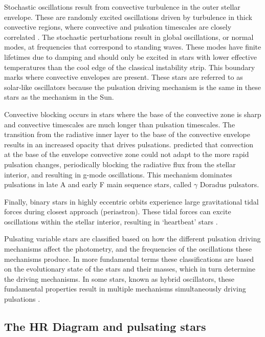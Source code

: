 Stochastic oscillations result from convective turbulence in the outer stellar envelope. These are randomly excited oscillations driven by turbulence in thick convective regions, where convective and pulsation timescales are closely correlated \citep{handler_asteroseismology_2013}. The stochastic perturbations result in global oscillations, or normal modes, at frequencies that correspond to standing waves. These modes have finite lifetimes due to damping and should only be excited in stars with lower effective temperatures than the cool edge of the classical instability strip. This boundary marks where convective envelopes are present. These stars are referred to as solar-like oscillators because the pulsation driving mechanism is the same in these stars as the mechanism in the Sun.

Convective blocking occurs in stars where the base of the convective zone is sharp and convective timescales are much longer than pulsation timescales. The transition from the radiative inner layer to the base of the convective envelope results in an increased opacity that drives pulsations. \cite{guzik_driving_2000} predicted that convection at the base of the envelope convective zone could not adapt to the more rapid pulsation changes, periodically blocking the radiative flux from the stellar interior, and resulting in g-mode oscillations. This mechanism dominates pulsations in late A and early F main sequence stars, called $\gamma$ Doradus pulsators.

Finally, binary stars in highly eccentric orbits experience large gravitational tidal forces during closest approach (periastron). These tidal forces can excite oscillations within the stellar interior, resulting in `heartbeat' stars \citep{thompson_class_2012}.

Pulsating variable stars are classified based on how the different pulsation driving mechanisms affect the photometry, and the frequencies of the oscillations these mechanisms produce. In more fundamental terms these classifications are based on the evolutionary state of the stars and their masses, which in turn determine the driving mechanisms. In some stars, known as hybrid oscillators, these fundamental properties result in multiple mechanisms simultaneously driving pulsations \cite[e.g.][]{antoci_excitation_2011}. 

\subsection{The HR Diagram and pulsating stars}

